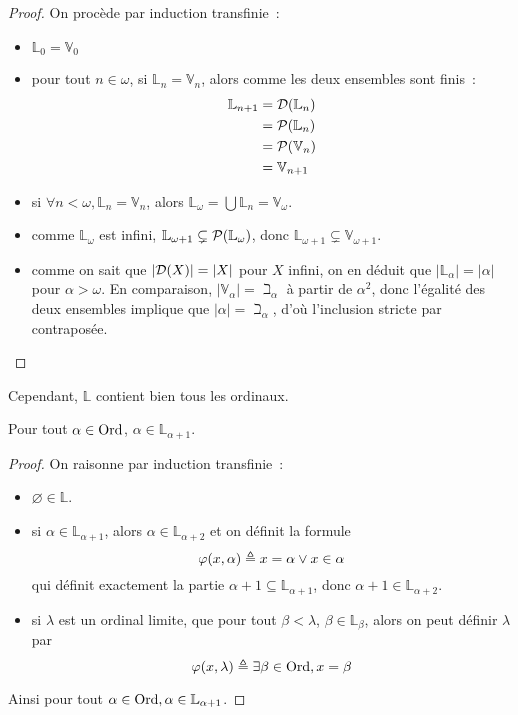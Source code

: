 \begin{proof}
  On procède par induction transfinie~:
  \begin{itemize}
  \item $\mathbb L_0 = \mathbb V_0$
  \item pour tout $n \in \omega$, si $\mathbb L_n = \mathbb V_n$, alors comme
    les deux ensembles sont finis~:
    \begin{align*}
      \mathbb L_{n+1} &= \mathcal{D}(\mathbb L_n)\\
      &= \mathcal{P}(\mathbb L_n)\\
      &= \mathcal{P}(\mathbb V_n)\\
      &= \mathbb V_{n+1}
    \end{align*}
  \item si $\forall n < \omega, \mathbb L_n = \mathbb V_n$, alors
    $\mathbb L_\omega = \bigcup \mathbb L_n = \mathbb V_\omega$.
  \item comme $\mathbb L_\omega$ est infini,
    $\mathbb L_{\omega+1} \subsetneq \mathcal{P}(\mathbb L_\omega)$, donc
    $\mathbb L_{\omega+1} \subsetneq\mathbb V_{\omega+1}$.
  \item comme on sait que $|\mathcal{D}(X)| = |X|$ pour $X$ infini, on en déduit
    que $|\mathbb L_{\alpha}| = |\alpha|$ pour $\alpha > \omega$. En comparaison,
    $|\mathbb V_\alpha| = \beth_\alpha$ à partir de $\alpha^2$, donc l'égalité
    des deux ensembles implique que $|\alpha| = \beth_\alpha$, d'où l'inclusion
    stricte par contraposée.
  \end{itemize}
\end{proof}

Cependant, $\mathbb L$ contient bien tous les ordinaux.

\begin{proposition}
  Pour tout $\alpha \in \operatorname{Ord}$, $\alpha \in \mathbb L_{\alpha + 1}$.
\end{proposition}

\begin{proof}
  On raisonne par induction transfinie~:
  \begin{itemize}
  \item $\varnothing \in \mathbb L$.
  \item si $\alpha \in \mathbb L_{\alpha + 1}$,
    alors $\alpha \in \mathbb L_{\alpha + 2}$ et on définit la formule
    \[\varphi(x,\alpha) \triangleq x = \alpha \lor x \in \alpha\]
    qui définit exactement la partie
    $\alpha + 1 \subseteq \mathbb L_{\alpha + 1}$, donc
    $\alpha + 1 \in \mathbb L_{\alpha + 2}$.
  \item si $\lambda$ est un ordinal limite, que pour tout $\beta < \lambda$,
    $\beta \in \mathbb L_\beta$, alors on peut définir $\lambda$ par
    \[\varphi(x,\lambda) \triangleq \exists \beta\in \operatorname{Ord}, x = \beta\]
  \end{itemize}
  Ainsi pour tout $\alpha \in \operatorname{Ord}, \alpha \in \mathbb L_{\alpha + 1}$.
\end{proof}

